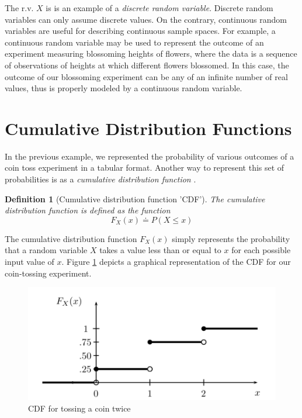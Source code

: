 \documentclass[
  12pt,
  twoside]{book}
\theoremstyle{definition}
\newtheorem{definition}{Definition}[chapter]
\theoremstyle{definition}
\theoremstyle{definition}
\theoremstyle{remark}
\begin{document}
The r.v. \(X\) is is an example of a \emph{discrete random variable}.
Discrete random variables can only assume discrete values.
On the contrary, continuous random variables are useful for describing continuous sample spaces.
For example, a continuous random variable may be used to represent the outcome of an experiment measuring blossoming heights of flowers, where the data is a sequence of observations of heights at which different flowers blossomed.
In this case, the outcome of our blossoming experiment can be any of an infinite number of real values, thus is properly modeled by a continuous random variable.

\hypertarget{cumulative-distribution-functions}{%
\section{Cumulative Distribution Functions}\label{cumulative-distribution-functions}}

In the previous example, we represented the probability of various outcomes of a coin toss experiment in a tabular format.
Another way to represent this set of probabilities is as a \emph{cumulative distribution function} \citep[  2.2]{Wasserman2004}.

\begin{definition}[Cumulative distribution function 'CDF']
\protect\hypertarget{def:cdf}{}{\label{def:cdf} {} }\emph{The cumulative distribution function is defined as the function}
\[F_{X}(x) \doteq P(X≤x)\]
\end{definition}

The cumulative distribution function \(F_{X}(x)\) simply represents the probability that a random variable \(X\) takes a value less than or equal to \(x\) for each possible input value of \(x\).
Figure \ref{fig:cdfimg} depicts a graphical representation of the CDF for our coin-tossing experiment.



\begin{figure}

{\centering \includegraphics[width=0.7\linewidth]{./images/cdf} 

}

\caption{CDF for tossing a coin twice \citep[  2.2]{Wasserman2004}}\label{fig:cdfimg}
\end{figure}
\end{document}
